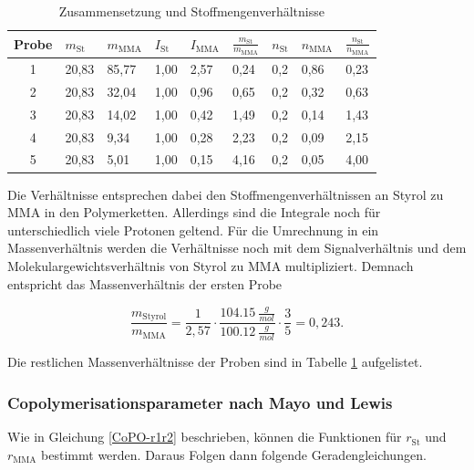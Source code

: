 \documentclass[10pt,a4paper,ngerman]{scrartcl}
\begin{document}
		\begin{table}[ht]
			\centering
			\caption{Zusammensetzung und Stoffmengenverhältnisse}
			\label{Tabelle-Versuch2}
			\small %
			\begin{tabularx}{\textwidth}{@{} c *{8}{X} @{}}
				\toprule
				\textbf{Probe} & \textbf{$m_\text{St}$} & \textbf{$m_\text{MMA}$} & \textbf{$I_\text{St}$} & \textbf{$I_\text{MMA}$} & \textbf{$\frac{m_\text{St}}{m_\text{MMA}}$} & \textbf{$n_\text{St}$} & \textbf{$n_\text{MMA}$} & \textbf{$\frac{n_\text{St}}{n_\text{MMA}}$} \\
				\midrule
				1 & 20,83 & 85,77 & 1,00 & 2,57 & 0,24 & 0,2 & 0,86 & 0,23 \\
				2 & 20,83 & 32,04 & 1,00 & 0,96 & 0,65 & 0,2 & 0,32 & 0,63 \\
				3 & 20,83 & 14,02 & 1,00 & 0,42 & 1,49 & 0,2 & 0,14  & 1,43 \\
				4 & 20,83 & 9,34  & 1,00 & 0,28 & 2,23 & 0,2 & 0,09 & 2,15 \\
				5 & 20,83 & 5,01  & 1,00 & 0,15 & 4,16 & 0,2 & 0,05 & 4,00 \\ 
				\bottomrule
			\end{tabularx}
		\end{table}

		Die Verhältnisse entsprechen dabei den Stoffmengenverhältnissen an Styrol zu MMA in den Polymerketten. Allerdings sind die Integrale noch für unterschiedlich viele 
		Protonen geltend. 
		Für die Umrechnung in ein Massenverhältnis werden die Verhältnisse noch mit dem Signalverhältnis und dem Molekulargewichtsverhältnis von Styrol zu MMA multipliziert. 
		Demnach entspricht das Massenverhältnis der ersten Probe 

		\begin{equation*}
			\frac{m_\text{Styrol}}{m_\text{MMA}} = \frac{1}{2,57} \cdot \frac{\SI{104,15}{\frac{g}{mol}}}{\SI{100,12}{\frac{g}{mol}}} \cdot \frac{3}{5} = 0,243 \text{.}
		\end{equation*}

		Die restlichen Massenverhältnisse der Proben sind in Tabelle \ref{Tabelle-Versuch2} aufgelistet.

	 \subsubsection{Copolymerisationsparameter nach Mayo und Lewis}

		
		Wie in Gleichung \ref{CoPO-r1r2} beschrieben, können die Funktionen für $r_\text{St}$ und $r_\text{MMA}$ bestimmt werden. 
		Daraus Folgen dann folgende Geradengleichungen.
\end{document}
